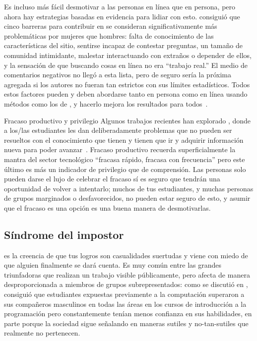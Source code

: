 Es incluso más fácil desmotivar a las personas en línea que en persona,
pero ahora hay estrategias basadas en evidencia para lidiar con esto.
\cite{Ford2016} consiguió que cinco barreras para contribuir en 
se consideran significativamente más problemáticas por mujeres que hombres:
falta de conocimiento de las características del sitio,
sentirse incapaz de contestar preguntas,
un tamaño de comunidad intimidante,
malestar interactuando con extraños o depender de ellos,
y la sensación de que buscando cosas en línea no era ``trabajo real.''
El medio de comentarios negativos no llegó a esta lista,
pero de seguro sería la próxima agregada si los autores no fueran tan estrictos con sus límites estadísticos.
Todos estos factores pueden y deben abordarse tanto en persona como en línea
usando métodos como los de ,
y hacerlo mejora los resultados para todos~\cite{Sved2016}.

\begin{aside}{Fracaso productivo y privilegio}
  Algunos trabajos recientes han explorado ,
  donde a los/las estudiantes les dan deliberadamente problemas que no pueden ser resueltos con el conocimiento que tienen
  y tienen que ir y adquirir información nueva para poder avanzar~\cite{Kapu2016}.
  Fracaso productivo recuerda superficialmente la mantra del sector tecnológico ``fracasa rápido, fracasa con frecuencia''
  pero este último es más un indicador de privilegio que de comprensión.
  Las personas solo pueden darse el lujo de celebrar el fracaso sí es seguro que tendrán una oportunidad de volver a intentarlo;
  muchos de tus estudiantes,
  y muchas personas de grupos marginados o desfavorecidos,
  no pueden estar seguro de esto,
  y asumir que el fracaso es una opción es una buena manera de desmotivarlas.
\end{aside}

\subsection*{Síndrome del impostor}

es la creencia de que tus logros son casualidades suertudas
y viene con miedo de que alguien finalmente se dará cuenta.
Es muy común entre las grandes triunfadoras que realizan un trabajo visible públicamente,
pero afecta de manera desproporcionada a miembros de grupos subrepresentados:
como se discutió en ,
\cite{Wilc2018} consiguió que
estudiantes expuestas previamente a la computación superaron a sus compañeros masculinos en todas las áreas en los cursos de introducción a la programación
pero constantemente tenían menos confianza en sus habilidades,
en parte porque la sociedad sigue señalando en maneras sutiles y no-tan-sutiles
que realmente no pertenecen.

